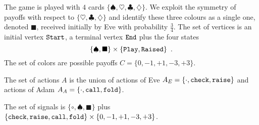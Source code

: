%
%
%


The game is played with  $4$ cards $\{\spadesuit,\heartsuit,\clubsuit,\diamondsuit\}$.
We exploit the symmetry of payoffs with respect to $\{\heartsuit,\clubsuit,\diamondsuit\}$ and identify these three colours 
as a single one, denoted $\blacksquare$, received initially by Eve with probability $\frac{3}{4}$.
The set of vertices
is an initial vertex ${\tt Start}$,
a terminal vertex ${\tt End}$
plus the four states
\[
\{\spadesuit,\blacksquare\} \times 
 \{{\tt Play,Raised}\}\enspace.
 \]
The set of colors are possible payoffs $C=\{0,-1,+1,-3,+3\}$.

The set of actions $A$ 
is the union of 
actions of Eve 
$A_E=\{{\tt \cdot, check,raise}\}$
and actions of Adam
$A_A=\{{\tt \cdot, call, fold}\}$.

The set of signals is $\{\circ , \spadesuit, \blacksquare\}$ plus
$\{{\tt check},{\tt raise},{\tt call},{\tt fold}\}\times \{0,-1,+1,-3,+3\}$.

